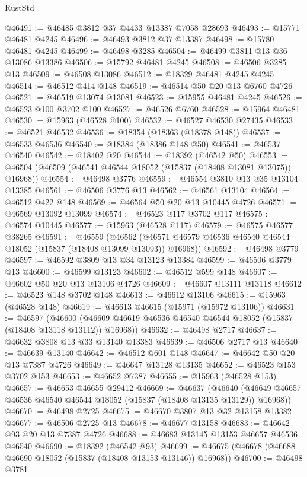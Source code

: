 \begin{lexlean}{RustStd}
\begin{coremodule}
@46491 := @46485 @3812 @37 @4433 @13387 @7058 @28693
@46493 := @15771 @46481 @4245
@46496 := @46493 @3812 @37 @13387
@46498 := @15780 @46481 @4245
@46499 := @46498 @3285
@46504 := @46499 @3811 @13 @36 @13086 @13386
@46506 := @15792 @46481 @4245
@46508 := @46506 @3285 @13
@46509 := @46508 @13086
@46512 := @18329 @46481 @4245 @4245
@46514 := @46512 @414 @148
@46519 := @46514 @50 @20 @13 @6760 @4726
@46521 := @46519 @13074 @13081
@46523 := @15955 @46481 @4245
@46526 := @46523 @100 @3702 @100
@46527 := @46526 @6760
@46528 := @15964 @46481
@46530 := @15963 (@46528 @100)
@46532 := @46527 @46530 @27435
@46533 := @46521 @46532
@46536 := @18354 (@18363 (@18378 @148))
@46537 := @46533 @46536
@46540 := @18384 (@18386 @148 @50)
@46541 := @46537 @46540
@46542 := @18402 @20
@46544 := @18392 (@46542 @50)
@46553 := @46504 (@46509 (@46541 @46544 @18052 (@15837 (@18408 @13081 @13075)) @16968))
@46554 := @46498 @3776
@46559 := @46554 @3810 @13 @35 @13104 @13385
@46561 := @46506 @3776 @13
@46562 := @46561 @13104
@46564 := @46512 @422 @148
@46569 := @46564 @50 @20 @13 @10445 @4726
@46571 := @46569 @13092 @13099
@46574 := @46523 @117 @3702 @117
@46575 := @46574 @10445
@46577 := @15963 (@46528 @117)
@46579 := @46575 @46577 @38265
@46591 := @46559
    (@46562 (@46571 @46579 @46536 @46540 @46544 @18052 (@15837 (@18408 @13099 @13093)) @16968))
@46592 := @46498 @3779
@46597 := @46592 @3809 @13 @34 @13123 @13384
@46599 := @46506 @3779 @13
@46600 := @46599 @13123
@46602 := @46512 @599 @148
@46607 := @46602 @50 @20 @13 @13106 @4726
@46609 := @46607 @13111 @13118
@46612 := @46523 @148 @3702 @148
@46613 := @46612 @13106
@46615 := @15963 (@46528 @148)
@46619 := @46613 @46615 (@15971 (@15972 @13106))
@46631 := @46597
    (@46600 (@46609 @46619 @46536 @46540 @46544 @18052 (@15837 (@18408 @13118 @13112)) @16968))
@46632 := @46498 @2717
@46637 := @46632 @3808 @13 @33 @13140 @13383
@46639 := @46506 @2717 @13
@46640 := @46639 @13140
@46642 := @46512 @601 @148
@46647 := @46642 @50 @20 @13 @7387 @4726
@46649 := @46647 @13128 @13135
@46652 := @46523 @153 @3702 @153
@46653 := @46652 @7387
@46655 := @15963 (@46528 @153)
@46657 := @46653 @46655 @29412
@46669 := @46637
    (@46640 (@46649 @46657 @46536 @46540 @46544 @18052 (@15837 (@18408 @13135 @13129)) @16968))
@46670 := @46498 @2725
@46675 := @46670 @3807 @13 @32 @13158 @13382
@46677 := @46506 @2725 @13
@46678 := @46677 @13158
@46683 := @46642 @93 @20 @13 @7387 @4726
@46688 := @46683 @13145 @13153 @46657 @46536 @46540
@46690 := @18392 (@46542 @93)
@46699 := @46675 (@46678 (@46688 @46690 @18052 (@15837 (@18408 @13153 @13146)) @16968))
@46700 := @46498 @3781

\end{coremodule}
\end{lexlean}
